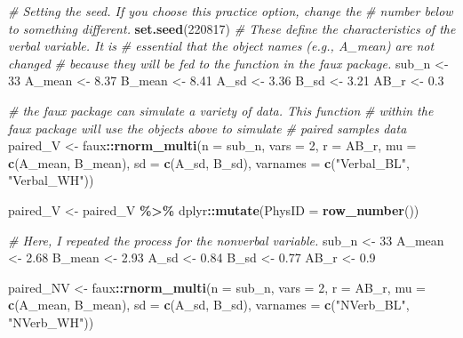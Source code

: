 \documentclass[
  11pt,
]{book}
\newenvironment{Shaded}{\begin{snugshade}}{\end{snugshade}}
\newcommand{\AttributeTok}[1]{\textcolor[rgb]{0.27,0.27,0.27}{#1}}
\newcommand{\CommentTok}[1]{\textcolor[rgb]{0.37,0.37,0.37}{\textit{#1}}}
\newcommand{\DecValTok}[1]{\textcolor[rgb]{0.06,0.06,0.06}{#1}}
\newcommand{\FloatTok}[1]{\textcolor[rgb]{0.06,0.06,0.06}{#1}}
\newcommand{\FunctionTok}[1]{\textcolor[rgb]{0.27,0.27,0.27}{\textbf{#1}}}
\newcommand{\NormalTok}[1]{#1}
\newcommand{\OtherTok}[1]{\textcolor[rgb]{0.37,0.37,0.37}{#1}}
\newcommand{\SpecialCharTok}[1]{\textcolor[rgb]{0.43,0.43,0.43}{\textbf{#1}}}
\newcommand{\StringTok}[1]{\textcolor[rgb]{0.5,0.5,0.5}{#1}}
\begin{document}
\begin{Shaded}
\begin{Highlighting}[]
\CommentTok{\# Setting the seed. If you choose this practice option, change the}
\CommentTok{\# number below to something different.}
\FunctionTok{set.seed}\NormalTok{(}\DecValTok{220817}\NormalTok{)}
\CommentTok{\# These define the characteristics of the verbal variable. It is}
\CommentTok{\# essential that the object names (e.g., A\_mean) are not changed}
\CommentTok{\# because they will be fed to the function in the faux package.}
\NormalTok{sub\_n }\OtherTok{\textless{}{-}} \DecValTok{33}
\NormalTok{A\_mean }\OtherTok{\textless{}{-}} \FloatTok{8.37}
\NormalTok{B\_mean }\OtherTok{\textless{}{-}} \FloatTok{8.41}
\NormalTok{A\_sd }\OtherTok{\textless{}{-}} \FloatTok{3.36}
\NormalTok{B\_sd }\OtherTok{\textless{}{-}} \FloatTok{3.21}
\NormalTok{AB\_r }\OtherTok{\textless{}{-}} \FloatTok{0.3}

\CommentTok{\# the faux package can simulate a variety of data. This function}
\CommentTok{\# within the faux package will use the objects above to simulate}
\CommentTok{\# paired samples data}
\NormalTok{paired\_V }\OtherTok{\textless{}{-}}\NormalTok{ faux}\SpecialCharTok{::}\FunctionTok{rnorm\_multi}\NormalTok{(}\AttributeTok{n =}\NormalTok{ sub\_n, }\AttributeTok{vars =} \DecValTok{2}\NormalTok{, }\AttributeTok{r =}\NormalTok{ AB\_r, }\AttributeTok{mu =} \FunctionTok{c}\NormalTok{(A\_mean,}
\NormalTok{    B\_mean), }\AttributeTok{sd =} \FunctionTok{c}\NormalTok{(A\_sd, B\_sd), }\AttributeTok{varnames =} \FunctionTok{c}\NormalTok{(}\StringTok{"Verbal\_BL"}\NormalTok{, }\StringTok{"Verbal\_WH"}\NormalTok{))}

\NormalTok{paired\_V }\OtherTok{\textless{}{-}}\NormalTok{ paired\_V }\SpecialCharTok{\%\textgreater{}\%}
\NormalTok{    dplyr}\SpecialCharTok{::}\FunctionTok{mutate}\NormalTok{(}\AttributeTok{PhysID =} \FunctionTok{row\_number}\NormalTok{())}

\CommentTok{\# Here, I repeated the process for the nonverbal variable.}
\NormalTok{sub\_n }\OtherTok{\textless{}{-}} \DecValTok{33}
\NormalTok{A\_mean }\OtherTok{\textless{}{-}} \FloatTok{2.68}
\NormalTok{B\_mean }\OtherTok{\textless{}{-}} \FloatTok{2.93}
\NormalTok{A\_sd }\OtherTok{\textless{}{-}} \FloatTok{0.84}
\NormalTok{B\_sd }\OtherTok{\textless{}{-}} \FloatTok{0.77}
\NormalTok{AB\_r }\OtherTok{\textless{}{-}} \FloatTok{0.9}

\NormalTok{paired\_NV }\OtherTok{\textless{}{-}}\NormalTok{ faux}\SpecialCharTok{::}\FunctionTok{rnorm\_multi}\NormalTok{(}\AttributeTok{n =}\NormalTok{ sub\_n, }\AttributeTok{vars =} \DecValTok{2}\NormalTok{, }\AttributeTok{r =}\NormalTok{ AB\_r, }\AttributeTok{mu =} \FunctionTok{c}\NormalTok{(A\_mean,}
\NormalTok{    B\_mean), }\AttributeTok{sd =} \FunctionTok{c}\NormalTok{(A\_sd, B\_sd), }\AttributeTok{varnames =} \FunctionTok{c}\NormalTok{(}\StringTok{"NVerb\_BL"}\NormalTok{, }\StringTok{"NVerb\_WH"}\NormalTok{))}


\end{Highlighting}
\end{Shaded}
\end{document}
